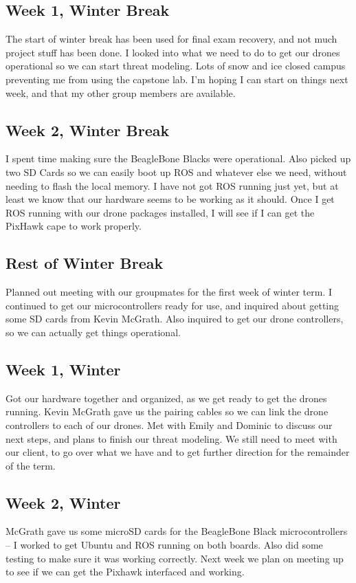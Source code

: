 \documentclass[IEEEtran,letterpaper,10pt,notitlepage,draftclsnofoot,onecolumn]{article}
\begin{document}
\begin{sloppypar}
\subsection{Week 1, Winter Break}
The start of winter break has been used for final exam recovery, and not much project stuff has been done. I looked into what we need to do to get our drones operational so we can start threat modeling. Lots of snow and ice closed campus preventing me from using the capstone lab. I'm hoping I can start on things next week, and that my other group members are available.
\subsection{Week 2, Winter Break}
I spent time making sure the BeagleBone Blacks were operational. Also picked up two SD Cards so we can easily boot up ROS and whatever else we need, without needing to flash the local memory. I have not got ROS running just yet, but at least we know that our hardware seems to be working as it should. Once I get ROS running with our drone packages installed, I will see if I can get the PixHawk cape to work properly.
\subsection{Rest of Winter Break}
Planned out meeting with our groupmates for the first week of winter term. I continued to get our microcontrollers ready for use, and inquired about getting some SD cards from Kevin McGrath. Also inquired to get our drone controllers, so we can actually get things operational.
\subsection{Week 1, Winter}
Got our hardware together and organized, as we get ready to get the drones running. Kevin McGrath gave us the pairing cables so we can link the drone controllers to each of our drones. Met with Emily and Dominic to discuss our next steps, and plans to finish our threat modeling. We still need to meet with our client, to go over what we have and to get further direction for the remainder of the term.
\subsection{Week 2, Winter}
McGrath gave us some microSD cards for the BeagleBone Black microcontrollers -- I worked to get Ubuntu and ROS running on both boards. Also did some testing to make sure it was working correctly. Next week we plan on meeting up to see if we can get the Pixhawk interfaced and working.

\end{sloppypar}
\end{document}
